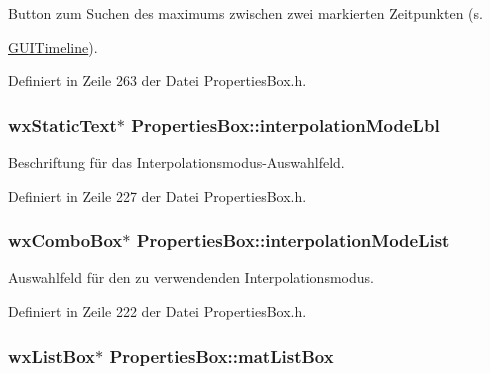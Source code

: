 Button zum Suchen des maximums zwischen zwei markierten Zeitpunkten (s. 

\hyperlink{classGUITimeline}{G\-U\-I\-Timeline}). 

Definiert in Zeile 263 der Datei Properties\-Box.\-h.

\hypertarget{classPropertiesBox_a7184c404a73e32cee30ac299ef9fe649}{
\subsubsection[{interpolation\-Mode\-Lbl}]{\setlength{\rightskip}{0pt plus 5cm}wx\-Static\-Text$\ast$ Properties\-Box\-::interpolation\-Mode\-Lbl\hspace{0.3cm}{\ttfamily [private]}}}\label{classPropertiesBox_a7184c404a73e32cee30ac299ef9fe649}


Beschriftung für das Interpolationsmodus-\/\-Auswahlfeld. 



Definiert in Zeile 227 der Datei Properties\-Box.\-h.

\hypertarget{classPropertiesBox_a3f5165a466fd9204f758a6fbb17507ae}{
\subsubsection[{interpolation\-Mode\-List}]{\setlength{\rightskip}{0pt plus 5cm}wx\-Combo\-Box$\ast$ Properties\-Box\-::interpolation\-Mode\-List\hspace{0.3cm}{\ttfamily [private]}}}\label{classPropertiesBox_a3f5165a466fd9204f758a6fbb17507ae}


Auswahlfeld für den zu verwendenden Interpolationsmodus. 



Definiert in Zeile 222 der Datei Properties\-Box.\-h.

\hypertarget{classPropertiesBox_affd4774a26bd75a30c1d1c07d02edd18}{
\subsubsection[{mat\-List\-Box}]{\setlength{\rightskip}{0pt plus 5cm}wx\-List\-Box$\ast$ Properties\-Box\-::mat\-List\-Box\hspace{0.3cm}{\ttfamily [private]}}}\label{classPropertiesBox_affd4774a26bd75a30c1d1c07d02edd18}


